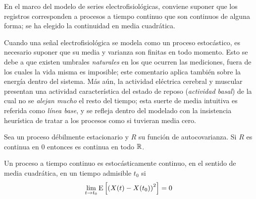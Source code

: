 %
En el marco del modelo de series electrofisiológicas, conviene suponer que los registros 
corresponden a procesos a tiempo continuo que son continuos de alguna forma; se ha elegido la 
continuidad en media cuadrática.

Cuando una señal electrofisiológica se modela como un proceso estocástico, es necesario suponer que su media y varianza son finitas en todo momento. 
%
Esto se debe a que existen umbrales \textit{naturales} en los que ocurren las mediciones, fuera de los cuales la vida misma es imposible; este comentario aplica también sobre la energía dentro del sistema.
%
Más aún, la actividad eléctrica cerebral y muscular presentan una actividad característica del estado de reposo (\textit{actividad basal}) de la cual no se \textit{alejan mucho} el resto del tiempo; esta suerte de media intuitiva es referida como \textit{línea base}, y se refleja dentro del modelado con la insistencia heurística de tratar a los procesos como si tuvieran media cero.

\begin{observacion}
Sea \xt un proceso débilmente estacionario y $R$ su función de autocovarianza. Si $R$ es continua
en 0 entonces es continua en todo $\mathbb{R}$.
\end{observacion}

\begin{definicion}
Un proceso a tiempo continuo \xt es estocásticamente continuo, en el sentido de media cuadrática, 
en un tiempo admisible $t_0$ si
\begin{equation*}
\lim_{t \rightarrow t_0} \mathrm{E}\left[ \left( X(t) - X(t_0) \right)^{2} \right] = 0
\end{equation*}
\label{cont_est}
\end{definicion}


